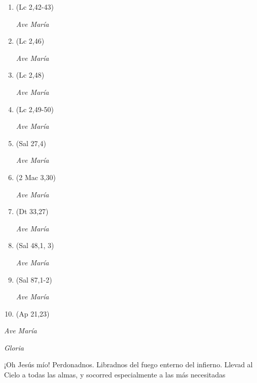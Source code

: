 \documentclass[a4paper,11pt, oneside]{report}
\begin{document}
        \begin{enumerate}

          \item (Lc 2,42-43)
          
          \textit{Ave María}

          \item (Lc 2,46)
          
          \textit{Ave María}

          \item (Lc 2,48)
          
          \textit{Ave María}

          \item (Lc 2,49-50)
          
          \textit{Ave María}

          \item (Sal 27,4)

          \textit{Ave María}

          \item (2 Mac 3,30)
          
          \textit{Ave María}

          \item (Dt 33,27)
          
          \textit{Ave María}

          \item (Sal 48,1, 3)
          
          \textit{Ave María}

          \item (Sal 87,1-2)
          
          \textit{Ave María}

          \item (Ap 21,23)

        \end{enumerate}

        \textit{Ave María} \par
        \indent\textit{Gloria} \par
        
        \medskip
        ¡Oh Jesús mío! Perdonadnos. Libradnos del fuego enterno del infierno. Llevad al Cielo a todas las almas, y socorred especialmente a las más 
        necesitadas
\end{document}
